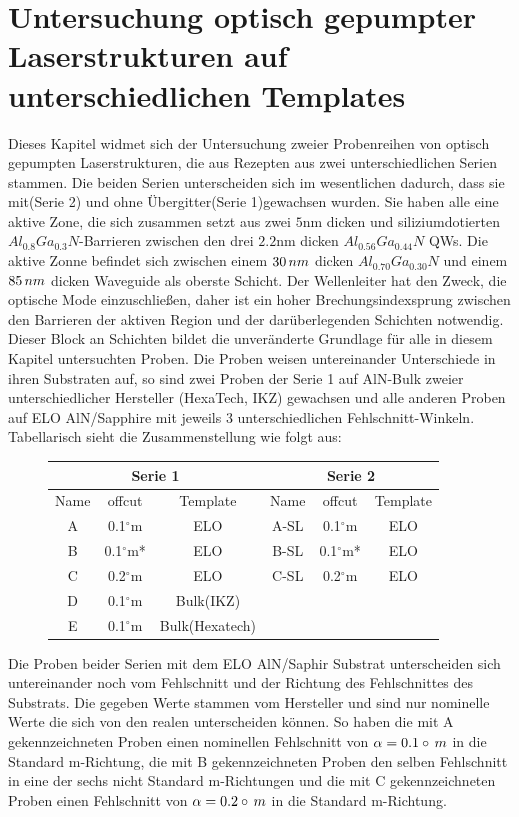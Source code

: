 \thispagestyle{fancy}
\justifying
\section{Untersuchung optisch gepumpter Laserstrukturen auf unterschiedlichen Templates}
Dieses Kapitel widmet sich der Untersuchung zweier Probenreihen von optisch gepumpten Laserstrukturen, die aus Rezepten aus zwei unterschiedlichen Serien stammen. Die beiden Serien unterscheiden sich im wesentlichen dadurch, dass sie mit(Serie 2) und ohne Übergitter(Serie 1)gewachsen wurden. Sie haben alle eine aktive Zone, die sich zusammen setzt aus zwei $5$nm dicken und siliziumdotierten $ Al_{0.8}Ga_{0.3}N$-Barrieren zwischen den drei $2.2$nm dicken $ Al_{0.56}Ga_{0.44}N$ QWs. Die aktive Zonne befindet sich zwischen einem $30 \thinspace nm$ dicken $ Al_{0.70}Ga_{0.30}N$ und einem $85 \thinspace nm$ dicken Waveguide als oberste Schicht. Der Wellenleiter hat den Zweck, die optische Mode einzuschließen, daher ist ein hoher Brechungsindexsprung zwischen den Barrieren der aktiven Region und der darüberlegenden Schichten notwendig.
Dieser Block an Schichten bildet die unveränderte Grundlage für alle in diesem Kapitel untersuchten Proben.
Die Proben weisen untereinander Unterschiede in ihren Substraten auf, so sind zwei Proben der Serie 1 auf AlN-Bulk zweier unterschiedlicher Hersteller (HexaTech, IKZ) gewachsen und alle anderen Proben auf ELO AlN/Sapphire mit jeweils 3 unterschiedlichen  Fehlschnitt-Winkeln. Tabellarisch sieht die Zusammenstellung wie folgt aus: 
\begin{figure}[H]
\begin{tabular}{ |c|c|c|c|c|c|   }
\hline
\multicolumn{3}{|c|}{Serie 1} & \multicolumn{3}{c|}{Serie 2}  \\
\hline
Name & offcut& Template & Name& offcut & Template \\
\hline
A & 0.1$^\circ$m & ELO & A-SL & 0.1$^\circ$m & ELO \\
B & 0.1$^\circ$m* & ELO & B-SL & 0.1$^\circ$m* & ELO \\
C & 0.2$^\circ$m & ELO & C-SL & 0.2$^\circ$m & ELO \\
D & 0.1$^\circ$m & Bulk(IKZ) &  & &  \\
E & 0.1$^\circ$m & Bulk(Hexatech) & & & \\
\hline
\end{tabular}
\end{figure}
\vspace{1cm}
\noindent 
Die Proben beider Serien mit dem ELO AlN/Saphir Substrat unterscheiden sich untereinander noch vom Fehlschnitt und der Richtung des Fehlschnittes des Substrats. Die gegeben Werte stammen vom Hersteller und sind nur nominelle Werte die sich von den realen unterscheiden können. So haben die mit A gekennzeichneten Proben einen nominellen Fehlschnitt von $\alpha = 0.1\circ \thinspace m$ in die Standard m-Richtung, die mit B gekennzeichneten Proben den selben Fehlschnitt in eine der sechs nicht Standard m-Richtungen und die mit C gekennzeichneten Proben einen Fehlschnitt von $\alpha = 0.2\circ \thinspace m$ in die Standard m-Richtung. 
